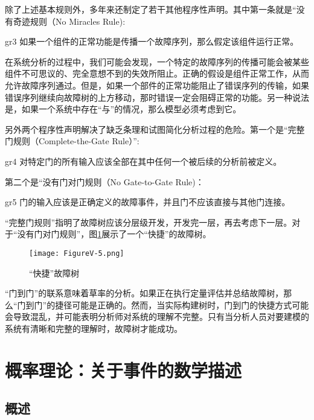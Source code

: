 \documentclass[cn,11pt,chinese]{elegantbook}
\begin{document}
 除了上述基本规则外，多年来还制定了若干其他程序性声明。其中第一条就是“没有奇迹规则（No Miracles Rule):
 
 \begin{postulate}{}{gr3}
 如果一个组件的正常功能是传播一个故障序列，那么假定该组件运行正常。
 \end{postulate}

 在系统分析的过程中，我们可能会发现，一个特定的故障序列的传播可能会被某些组件不可思议的、完全意想不到的失效所阻止。正确的假设是组件正常工作，从而允许故障序列通过。但是，如果一个部件的正常功能阻止了错误序列的传输，如果错误序列继续向故障树的上方移动，那时错误一定会阻碍正常的功能。另一种说法是，如果一个系统中存在“与”的情况，那么模型必须考虑到它。
 
 另外两个程序性声明解决了缺乏条理和试图简化分析过程的危险。第一个是“完整门规则（Complete-the-Gate Rule）”:
 
\begin{postulate}{}{gr4}
对特定门的所有输入应该全部在其中任何一个被后续的分析前被定义。
\end{postulate}

 第二个是“没有门对门规则（No Gate-to-Gate Rule)：

 \begin{postulate}{}{gr5}
 门的输入应该是正确定义的故障事件，并且门不应该直接与其他门连接。
 \end{postulate}

 “完整门规则”指明了故障树应该分层级开发，开发完一层，再去考虑下一层。对于“没有门对门规则”，图\ref{fig:fig5_5}展示了一个“快捷”的故障树。


\begin{figure}[H]
	\centering
	\texttt{[image: FigureV-5.png]}
	\caption{“快捷”故障树}\label{fig:fig5_5}
\end{figure}
 
 “门到门”的联系意味着草率的分析。如果正在执行定量评估并总结故障树，那么“门到门”的捷径可能是正确的。然而，当实际构建树时，门到门的快捷方式可能会导致混乱，并可能表明分析师对系统的理解不完整。只有当分析人员对要建模的系统有清晰和完整的理解时，故障树才能成功。
 
 \chapter{概率理论：关于事件的数学描述}
 \section{概述}
 
\end{document}
